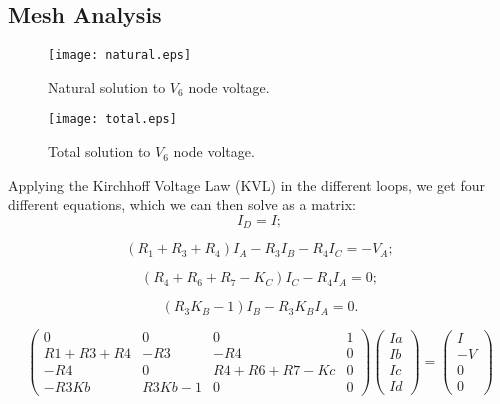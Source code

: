 \subsection{Mesh Analysis}

\begin{figure}[h] \centering
\texttt{[image: natural.eps]}
\caption{Natural solution to $V_{6}$ node voltage.}
\label{fig:current}
\end{figure}

\begin{figure}[h] \centering
\texttt{[image: total.eps]}
\caption{Total solution to $V_{6}$ node voltage.}
\label{fig:current}
\end{figure}

Applying the Kirchhoff Voltage Law (KVL) in the different loops, we get four different equations, which we can then solve as a matrix:
\begin{equation}
  I_D=I;
\end{equation}

\begin{equation}
  (R_1+R_3+R_4)I_A-R_3I_B-R_4I_C=-V_A;
\end{equation}

\begin{equation}
  (R_4+R_6+R_7-K_C)I_C-R_4I_A=0;
\end{equation}

\begin{equation}
  (R_3K_B-1)I_B-R_3K_BI_A=0.
\end{equation}

\begin{equation}
\begin{pmatrix}
0 & 0 & 0 & 1 \\
R1+R3+R4 & -R3 & -R4 & 0 \\
-R4 & 0 & R4+R6+R7-Kc & 0 \\
-R3Kb & R3Kb-1 & 0 & 0
\end{pmatrix}
\begin{pmatrix}
Ia\\
Ib\\
Ic\\
Id
\end{pmatrix}
=
\begin{pmatrix}
I\\
-V\\
0\\
0
\end{pmatrix}
\end{equation}


